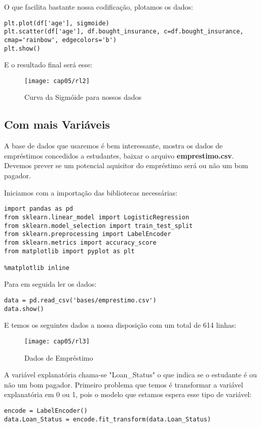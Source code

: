 O que facilita bastante nossa codificação, plotamos os dados:
\begin{lstlisting}[]
plt.plot(df['age'], sigmoide)
plt.scatter(df['age'], df.bought_insurance, c=df.bought_insurance, cmap='rainbow', edgecolors='b')
plt.show()
\end{lstlisting}

E o resultado final será esse:
\begin{figure}[H]
	\centering
	\texttt{[image: cap05/rl2]}
	\caption{Curva da Sigmóide para nossos dados}
\end{figure}

\subsection{Com mais Variáveis}
A base de dados que usaremos é bem interessante, mostra os dados de empréstimos concedidos a estudantes, baixar o arquivo \textbf{emprestimo.csv}. Devemos prever se um potencial aquisitor do empréstimo será ou não um bom pagador.

Iniciamos com a importação das bibliotecas necessárias:
\begin{lstlisting}[]
import pandas as pd
from sklearn.linear_model import LogisticRegression
from sklearn.model_selection import train_test_split
from sklearn.preprocessing import LabelEncoder
from sklearn.metrics import accuracy_score
from matplotlib import pyplot as plt

%matplotlib inline
\end{lstlisting}

Para em seguida ler os dados:
\begin{lstlisting}[]
data = pd.read_csv('bases/emprestimo.csv')
data.show()
\end{lstlisting}

E temos os seguintes dados a nossa disposição com um total de 614 linhas:
\begin{figure}[H]
	\centering
	\texttt{[image: cap05/rl3]}
	\caption{Dados de Empréstimo}
\end{figure}

A variável explanatória chama-se "Loan\_Status" o que indica se o estudante é ou não um bom pagador. Primeiro problema que temos é transformar a variável explanatória em 0 ou 1, pois o modelo que estamos espera esse tipo de variável:
\begin{lstlisting}[]
encode = LabelEncoder()
data.Loan_Status = encode.fit_transform(data.Loan_Status)
\end{lstlisting}

